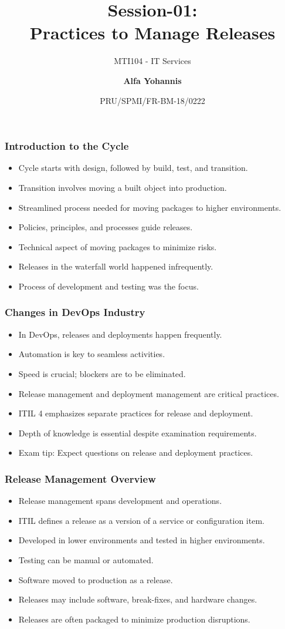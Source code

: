 \documentclass[aspectratio=169, table]{beamer}
\subtitle{MTI104 - IT Services}
\title{Session-01:\\\LARGE{Practices to Manage Releases\\}}
\date[Serial]{\scriptsize {PRU/SPMI/FR-BM-18/0222}}
\author[Pradita]{\small{\textbf{Alfa Yohannis}}}
\begin{document}
\frame{\titlepage}

\begin{frame}
	\frametitle{Introduction to the Cycle}
	\begin{itemize}
		\item Cycle starts with design, followed by build, test, and transition.
		\item Transition involves moving a built object into production.
		\item Streamlined process needed for moving packages to higher environments.
		\item Policies, principles, and processes guide releases.
		\item Technical aspect of moving packages to minimize risks.
		\item Releases in the waterfall world happened infrequently.
		\item Process of development and testing was the focus.
	\end{itemize}
\end{frame}

\begin{frame}
	\frametitle{Changes in DevOps Industry}
	\begin{itemize}
		\item In DevOps, releases and deployments happen frequently.
		\item Automation is key to seamless activities.
		\item Speed is crucial; blockers are to be eliminated.
		\item Release management and deployment management are critical practices.
		\item ITIL 4 emphasizes separate practices for release and deployment.
		\item Depth of knowledge is essential despite examination requirements.
		\item Exam tip: Expect questions on release and deployment practices.
	\end{itemize}
\end{frame}

\begin{frame}
	\frametitle{Release Management Overview}
	\begin{itemize}
		\item Release management spans development and operations.
		\item ITIL defines a release as a version of a service or configuration item.
		\item Developed in lower environments and tested in higher environments.
		\item Testing can be manual or automated.
		\item Software moved to production as a release.
		\item Releases may include software, break-fixes, and hardware changes.
		\item Releases are often packaged to minimize production disruptions.
	\end{itemize}
\end{frame}
\end{document}

